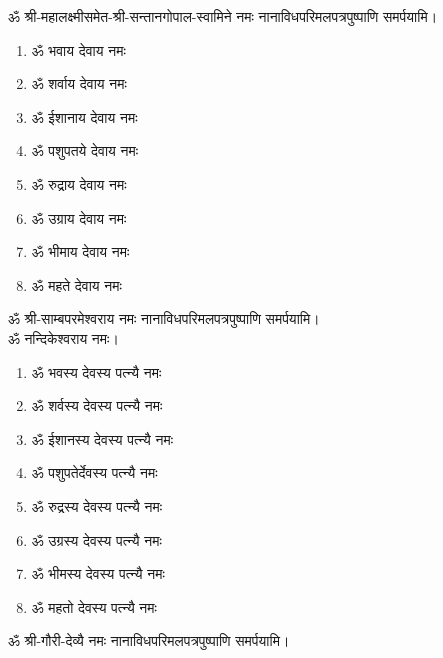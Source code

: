 \begin{center}
ॐ श्री-महालक्ष्मीसमेत-श्री-सन्तानगोपाल-स्वामिने नमः नानाविधपरिमलपत्रपुष्पाणि समर्पयामि। \medskip

\clearpage
{}

\vspace{-1em}
\begin{multicols}{2}
\begin{enumerate}
\item ॐ भवाय देवाय नमः
\item ॐ शर्वाय देवाय नमः
\item ॐ ईशानाय देवाय नमः
\item ॐ पशुपतये देवाय नमः
\item ॐ रुद्राय देवाय नमः
\item ॐ उग्राय देवाय नमः
\item ॐ भीमाय देवाय नमः
\item ॐ महते देवाय नमः
\end{enumerate}
\end{multicols}
\vspace{-1em}
ॐ श्री-साम्बपरमेश्वराय नमः नानाविधपरिमलपत्रपुष्पाणि समर्पयामि। \\
ॐ नन्दिकेश्वराय नमः।

\begin{enumerate}
\item ॐ भवस्य देवस्य पत्न्यै नमः
\item ॐ शर्वस्य देवस्य पत्न्यै नमः
\item ॐ ईशानस्य देवस्य पत्न्यै नमः
\item ॐ पशुपतेर्देवस्य पत्न्यै नमः
\item ॐ रुद्रस्य देवस्य पत्न्यै नमः
\item ॐ उग्रस्य देवस्य पत्न्यै नमः
\item ॐ भीमस्य देवस्य पत्न्यै नमः
\item ॐ महतो देवस्य पत्न्यै नमः
\end{enumerate}

ॐ श्री-गौरी-देव्यै नमः नानाविधपरिमलपत्रपुष्पाणि समर्पयामि। \medskip


\end{center}
